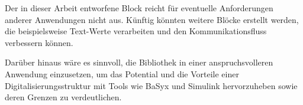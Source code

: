 Der in dieser Arbeit entworfene Block reicht für eventuelle Anforderungen anderer Anwendungen nicht aus. Künftig könnten weitere Blöcke erstellt werden, die beispielsweise Text-Werte verarbeiten und den Kommunikationsfluss verbessern können.   

Darüber hinaus wäre es sinnvoll, die Bibliothek in einer anspruchsvolleren Anwendung einzusetzen, um das Potential und die Vorteile einer Digitalisierungsstruktur mit Tools wie BaSyx und Simulink hervorzuheben sowie deren Grenzen zu verdeutlichen.


